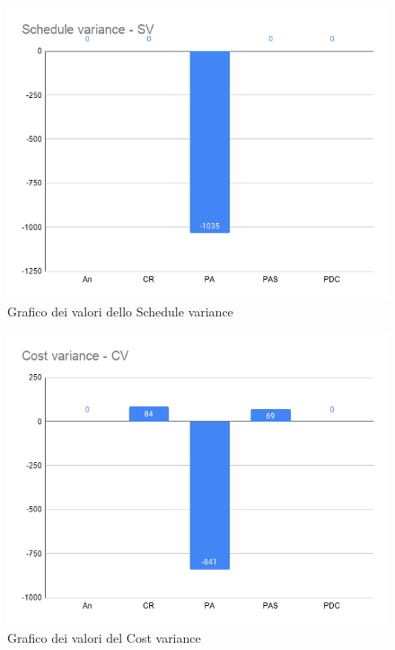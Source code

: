         \begin{figure}[H]
            \centering
            \includegraphics[width=13 cm]{source/sections/images/schedule_variance.png}
            \caption{Grafico dei valori dello Schedule variance}
        \end{figure}


        \begin{figure}[H]
            \centering
            \includegraphics[width=10 cm]{source/sections/images/cost_variance.png}
            \caption{Grafico dei valori del Cost variance}
        \end{figure}